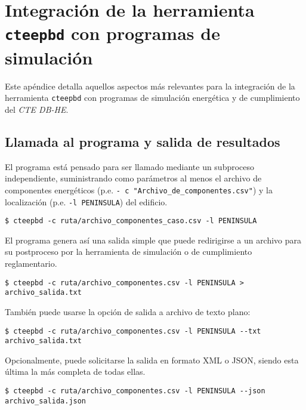 \documentclass[10pt,notitlepage,oneside,a4paper]{article}
\begin{document}
\clearpage
\newpage
\section{Integración de la herramienta \texttt{cteepbd} con programas de simulación}
\label{sec:anexointegracion}
\setcounter{figure}{0} %
\setcounter{table}{0} %

Este apéndice detalla aquellos aspectos más relevantes para la integración de la herramienta \texttt{cteepbd} con programas de simulación energética y de cumplimiento del \textit{CTE DB-HE}.

\subsection{Llamada al programa y salida de resultados}

El programa está pensado para ser llamado mediante un subproceso independiente, suministrando como parámetros al menos el archivo de componentes energéticos (p.e. \texttt{- c "Archivo\_de\_componentes.csv"}) y la localización (p.e. \texttt{-l PENINSULA}) del edificio.

\begin{Verbatim}[fontsize=\small]
    $ cteepbd -c ruta/archivo_componentes_caso.csv -l PENINSULA
\end{Verbatim}

El programa genera así una salida simple que puede redirigirse a un archivo para su postproceso por la herramienta de simulación o de cumplimiento reglamentario.

\begin{Verbatim}[fontsize=\small]
    $ cteepbd -c ruta/archivo_componentes.csv -l PENINSULA > archivo_salida.txt
\end{Verbatim}

También puede usarse la opción de salida a archivo de texto plano:

\begin{Verbatim}[fontsize=\small]
    $ cteepbd -c ruta/archivo_componentes.csv -l PENINSULA --txt archivo_salida.txt
\end{Verbatim}

Opcionalmente, puede solicitarse la salida en formato XML o JSON, siendo esta última la más completa de todas ellas.

\begin{Verbatim}[fontsize=\small]
    $ cteepbd -c ruta/archivo_componentes.csv -l PENINSULA --json archivo_salida.json
\end{Verbatim}
\end{document}
